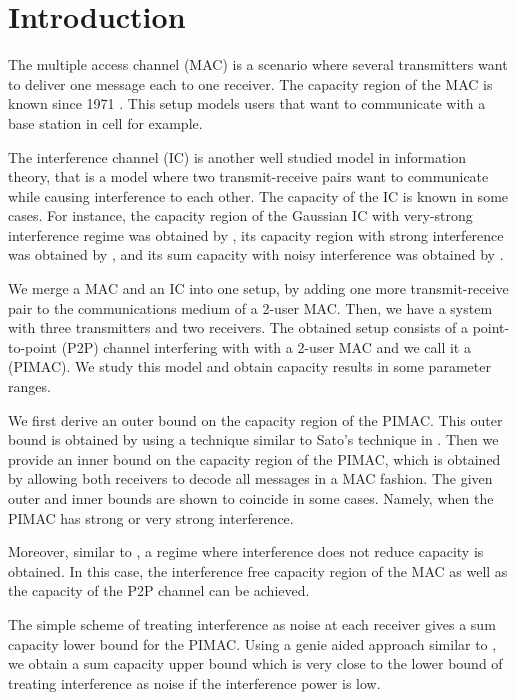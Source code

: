\documentclass[10pt,conference]{IEEEtran}
\begin{document}
\section{Introduction}
The multiple access channel (MAC) is a scenario where several transmitters want to deliver one message each to one receiver. The capacity region of the MAC is known since 1971 \cite{Ahlswede,Liao}. This setup models users that want to communicate with a base station in cell for example. 

The interference channel (IC) is another well studied model in information theory, that is a model where two transmit-receive pairs want to communicate while causing interference to each other. The capacity of the IC is known in some cases. For instance, the capacity region of the Gaussian IC with very-strong interference regime was obtained by \cite{Carleial_vsi}, its capacity region with strong interference was obtained by \cite{Sato}, and its sum capacity with noisy interference was obtained by \cite{AnnapureddyVeeravalli,ShangKramerChen,MotahariKhandani}.

We merge a MAC and an IC into one setup, by adding one more transmit-receive pair to the communications medium of a 2-user MAC. Then, we have a system with three transmitters and two receivers. The obtained setup consists of a point-to-point (P2P) channel interfering with with a 2-user MAC and we call it a (PIMAC). We study this model and obtain capacity results in some parameter ranges.

We first derive an outer bound on the capacity region of the PIMAC. This outer bound is obtained by using a technique similar to Sato's technique in \cite{Sato}. Then we provide an inner bound on the capacity region of the PIMAC, which is obtained by allowing both receivers to decode all messages in a MAC fashion. The given outer and inner bounds are shown to coincide in some cases. Namely, when the PIMAC has strong or very strong interference.

Moreover, similar to \cite{Carleial_vsi}, a regime where interference does not reduce capacity is obtained. In this case, the interference free capacity region of the MAC as well as the capacity of the P2P channel can be achieved.

The simple scheme of treating interference as noise at each receiver gives a sum capacity lower bound for the PIMAC. Using a genie aided approach similar to \cite{AnnapureddyVeeravalli}, we obtain a sum capacity upper bound which is very close to the lower bound of treating interference as noise if the interference power is low.
\end{document}
